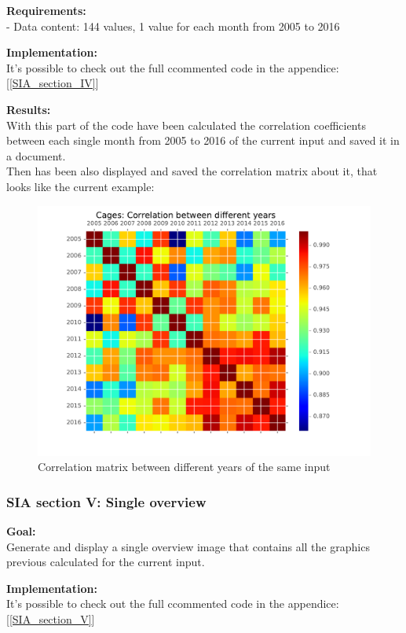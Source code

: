 \textbf{Requirements:}\\
- Data content: 144 values, 1 value for each month from 2005 to 2016

\textbf{Implementation:}\\
It's possible to check out the full ccommented code in the appendice: [\ref{SIA_section_IV}]


\textbf{Results:} \\
With this part of the code have been calculated the correlation coefficients between each single month from 2005 to 2016 of the current input and saved it in a document. \\
Then has been also displayed and saved the correlation matrix about it, that looks like the current example:

\begin{figure}[H]
	\centering
    \includegraphics[width=1\textwidth]{Files/Cages_Years_Matrix.pdf}
    \caption{Correlation matrix between different years of the same input}
\end{figure}


\newpage
\subsubsection{SIA section V: Single overview}

\textbf{Goal:}\\
Generate and display a single overview image that contains all the graphics previous calculated for the current input.

\textbf{Implementation:}\\
It's possible to check out the full ccommented code in the appendice: [\ref{SIA_section_V}]

